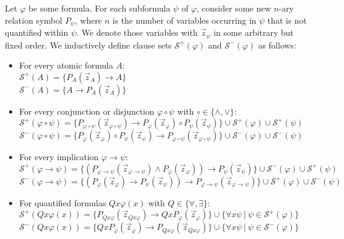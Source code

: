 \documentclass[a4paper,UKenglish,cleveref, autoref, thm-restate]{lipics-v2021}
\begin{document}
\begin{definition}
Let $\varphi$ be some formula. For each subformula $\psi$ of $\varphi$, consider some new $n$-ary relation symbol $P_\psi$, where $n$ is the number of variables occurring in $\psi$ that is not quantified within $\psi$. We denote those variables with $\vec z_\psi$ in some arbitrary but fixed order. We inductively define clause sets $\mathcal S^+(\varphi)$ and $\mathcal S^-(\varphi)$ as follows:
	\begin{itemize}
		\item For every atomic formula $A$:\\
$\mathcal S^+(A) = \{P_A(\vec z_A)\to A\}$\\$\mathcal S^-(A) = \{A\to P_A(\vec z_A)\}$
		\item For every conjunction or disjunction $\varphi\circ\psi$ with $\circ\in\{\wedge,\vee\}$:\\
$\mathcal S^+(\varphi\circ\psi) = \{P_{\varphi\circ\psi}(\vec z_{\varphi\circ\psi})\to P_{\varphi}(\vec z_\varphi)\circ P_{\psi}(\vec z_\psi)\}\cup \mathcal S^+(\varphi)\cup \mathcal S^+(\psi)$\\$\mathcal S^-(\varphi\circ\psi) =\{P_{\varphi}(\vec z_\varphi)\circ P_{\psi}(\vec z_\psi)\to P_{\varphi\circ\psi}(\vec z_{\varphi\circ\psi})\}\cup \mathcal S^-(\varphi)\cup \mathcal S^-(\psi)$
		\item For every implication $\varphi \to\psi$:\\
$\mathcal S^+(\varphi\to\psi) = \{(P_{\varphi\to\psi}(\vec z_{\varphi\to\psi})\wedge P_{\varphi}(\vec z_\varphi))\to P_{\psi}(\vec z_\psi)\}\cup \mathcal S^-(\varphi)\cup \mathcal S^+(\psi)$\\$\mathcal S^-(\varphi\to\psi)  = \{(P_{\varphi}(\vec z_\varphi)\to P_{\psi}(\vec z_\psi))\to P_{\varphi\to\psi}(\vec z_{\varphi\to\psi})\}\cup \mathcal S^+(\varphi)\cup \mathcal S^-(\psi)$
		\item For quantified formulas $Qx\varphi(x)$ with $Q\in \{\forall,\exists\}$:\\
$\mathcal S^+(Qx\varphi(x)) = \{P_{Qx\varphi}(\vec z_{Qx\varphi})\to QxP_{\varphi}(\vec z_{\varphi})\}\cup \{\forall x\psi\:|\:\psi\in\mathcal S^+(\varphi)\}$\\$\mathcal S^-(Qx\varphi(x))  = \{QxP_{\varphi}(\vec z_{\varphi})\to P_{Qx\varphi}(\vec z_{Qx\varphi})\}\cup \{\forall x\psi\:|\:\psi\in\mathcal S^-(\varphi)\}$
	\end{itemize}
\end{definition}
\end{document}
